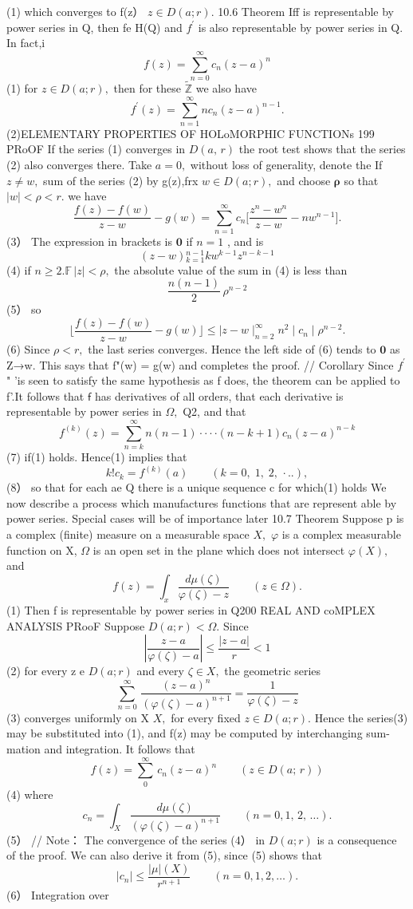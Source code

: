 (1) which converges to f(z） $z\in D(a;r).$ 10.6 Theorem Iff is representable by power series in Q, then fe H(Q) and $f^{\prime}$ is also representable by power series in Q. In fact,i $$ f(z)=\sum_{n=0}^{\infty}c_{n}(z-a)^{n} $$ (1) for $z\in D(a;r),$ then for these $\widetilde{\mathbb{Z}}$ we also have $$ f^{\prime}(z)=\sum_{n=1}^{\infty}n c_{n}(z-a)^{n-1}. $$ (2)ELEMENTARY PROPERTIES OF HOLoMORPHIC FUNCTIONs 199 PRoOF If the series (1) converges in $\scriptstyle D(a,\,r)$ the root test shows that the series (2) also converges there. Take $\scriptstyle a=0,$ without loss of generality, denote the If $z\neq w,$ sum of the series (2) by g(z),frx $w\in D(a;r),$ and choose $\boldsymbol{\rho}$ so that $|w|<\rho<r.$ we have $$ {\frac{f(z)-f(w)}{z-w}}-g(w)=\sum_{n=1}^{\infty}c_{n}{\biggl[}{\frac{z^{n}-w^{n}}{z-w}}-n w^{n-1}{\biggr]}. $$ (3） The expression in brackets is $\mathbf{0}$ if $\textstyle n=1$ , and is $$ (z-w){\!}_{k=1}^{n-1}k w^{k-1}z^{n-k-1} $$ (4) if $n\geq2.{\mathbb{F}}\,|z|<\rho,$ the absolute value of the sum in (4) is less than $$ {\frac{n(n-1)}{2}}\,\rho^{n-2} $$ (5） so $$ \lfloor{\frac{f(z)-f(w)}{z-w}}-g(w) \rfloor\leq\mid z-w\mid_{n=2}^{\infty}n^{2}\mid c_{n}\mid\rho^{n-2}. $$ (6) Since $\rho<r,$ the last series converges. Hence the left side of (6) tends to $\mathbf{0}$ as Z→w. This says that f"(w) = g(w) and completes the proof. // Corollary Since $f^{\prime}$ " ’is seen to satisfy the same hypothesis as f does, the theorem can be applied to f'.It follows that $\boldsymbol{\mathsf{f}}$ has derivatives of all orders, that each derivative is representable by power series in $\Omega,$ Q2, and that $$ f^{(k)}(z)=\sum_{n=k}^{\infty}n(n-1)\cdot\cdot\cdot\cdot(n-k+1)c_{n}(z-a)^{n-k} $$ (7) if(1) holds. Hence(1) implies that $$ k!c_{k}=f^{(k)}(a)\qquad(k=0,\;1,\;2,\,\cdot..), $$ (8） so that for each ae Q there is a unique sequence {c} for which(1) holds We now describe a process which manufactures functions that are represent able by power series. Special cases will be of importance later 10.7 Theorem Suppose p is a complex (finite) measure on a measurable space $X,$ $\varphi$ is a complex measurable function on X, $\Omega$ is an open set in the plane which does not intersect $\varphi(X),$ and $$ f(z)=\int_{x}{\frac{d\mu(\zeta)}{\varphi(\zeta)-z}}\qquad(z\in\Omega). $$ (1) Then f is representable by power series in Q200 REAL AND coMPLEX ANALYSIS PRooF Suppose $D(a;r)<\Omega.$ Since $$ \left|\frac{z-a}{\varphi(\zeta)-a}\right|\leq\frac{|z-a|}{r}<1 $$ (2) for every z e $D(a;r)$ and every $\zeta\in X,$ the geometric series $$ \sum_{n=0}^{\infty}\,\frac{(z-a)^{n}}{(\varphi(\zeta)-a)^{n+1}}=\frac{1}{\varphi(\zeta)-z} $$ (3) converges uniformly on X $X,$ for every fixed $z\in D(a;r).$ Hence the series(3) may be substituted into (1), and f(z) may be computed by interchanging sum- mation and integration. It follows that $$ f(z)=\sum_{0}^{\infty}\,c_{n}(z-a)^{n}\qquad(z\in D(a;\,r)) $$ (4) where $$ c_{n}=\int_{X}\frac{d\mu(\zeta)}{(\varphi(\zeta)-a)^{n+1}}\qquad(n=0,1,\,2,\,\ldots). $$ (5） // Note： The convergence of the series (4） in $D(a;r)$ is a consequence of the proof. We can also derive it from (5), since (5) shows that $$ |c_{n}|\leq{\frac{|\mu|(X)}{r^{n+1}}}\qquad(n=0,1,2,\ldots). $$ (6） Integration over 